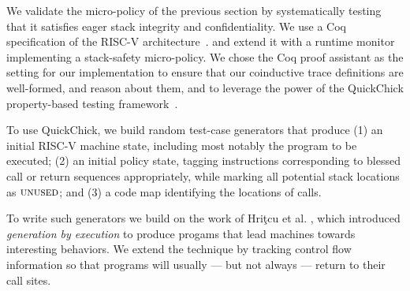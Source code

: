 \documentclass[10pt,conference]{ieeetran}%
\theoremstyle{definition}
\begin{document}
{We validate the micro-policy of the previous section by
systematically testing that it satisfies eager stack integrity and
confidentiality. We use a Coq specification of the RISC-V
architecture~\cite{Bourgeat2021AMF}.
and extend it with a runtime monitor implementing a stack-safety
micro-policy. We chose the Coq proof assistant as the setting for our implementation
to ensure that our coinductive trace definitions are well-formed, and reason about
them, and to leverage the power of the QuickChick property-based testing framework~\cite{Pierce:SF4}.

To use QuickChick, we build random test-case generators that produce
(1) an initial RISC-V machine state, including most notably
  the program to be executed;
(2)
  an initial policy state, tagging instructions corresponding to
  blessed call or return sequences appropriately, while marking
  all potential stack locations as $\textsc{unused}$; and
(3)
 a code map identifying the locations of calls.

To write such generators we build on the work of
Hri\c{t}cu et al. \cite{TestingNI:ICFP, DBLP:journals/jfp/HritcuLSADHPV16}, which
introduced {\em generation by execution} to produce progams that lead
machines towards interesting behaviors. We extend the technique by tracking
control flow information so that programs will usually --- but not always ---
return to their call sites.

}
\end{document}
